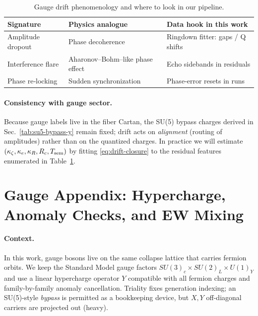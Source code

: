 \begin{table}[h]
\centering
\begin{tabular}{@{}lll@{}}
\toprule
\textbf{Signature} & \textbf{Physics analogue} & \textbf{Data hook in this work} \\
\midrule
Amplitude dropout & Phase decoherence & Ringdown fitter: gaps / Q shifts \\
Interference flare & Aharonov–Bohm–like phase effect & Echo sidebands in residuals \\
Phase re‑locking & Sudden synchronization & Phase‐error resets in runs \\
\bottomrule
\end{tabular}
\caption{Gauge drift phenomenology and where to look in our pipeline.}
\label{tab:gauge-drift-phenom}
\end{table}

\paragraph{Consistency with gauge sector.}
Because gauge labels live in the fiber Cartan, the SU(5) bypass charges derived in Sec.~\ref{tab:su5-bypass-y} remain fixed; drift acts on \emph{alignment} (routing of amplitudes) rather than on the quantized charges. In practice we will estimate $(\kappa_\zeta,\kappa_e,\kappa_R,R_c,T_{\rm sem})$ by fitting \eqref{eq:drift-closure} to the residual features enumerated in Table~\ref{tab:gauge-drift-phenom}.
\section{Gauge Appendix: Hypercharge, Anomaly Checks, and EW Mixing}
\label{sec:gauge-appendix}

\paragraph{Context.}
In this work, gauge bosons live on the same collapse lattice that carries fermion orbits.
We keep the Standard Model gauge factors $SU(3)_c\times SU(2)_L\times U(1)_Y$ and use a linear
hypercharge operator $Y$ compatible with all fermion charges and family-by-family anomaly cancellation.
Triality fixes generation indexing; an SU(5)-style \emph{bypass} is permitted as a bookkeeping device,
but $X,Y$ off-diagonal carriers are projected out (heavy).

